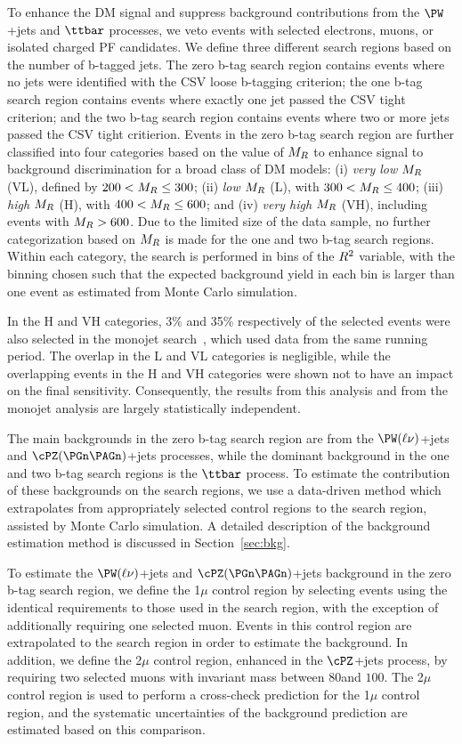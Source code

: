 To enhance the DM signal and suppress background contributions from the $\PW$+jets and $\ttbar$ processes,
we veto events with selected electrons, muons, or isolated charged PF candidates.
We define three different search regions based on the number of b-tagged jets. 
The zero b-tag search region contains events where no jets were identified with the CSV loose 
b-tagging criterion; the one b-tag search region contains events where exactly one jet
passed the CSV tight criterion; and the two b-tag search region contains events where two or more
jets passed the CSV tight critierion. Events in the zero b-tag search region are further classified 
into four categories based on the value of $M_R$ to enhance signal to background
discrimination for a broad class of DM models: 
(i) \textit{very low} $M_R$ (VL), defined by $200<M_R \leq 300$\GeV; 
(ii) \textit{low} $M_R$ (L), with $300 <M_R \leq 400$\GeV; 
(iii) \textit{high} $M_R$ (H), with $400 <M_R\leq 600$\GeV; 
and (iv) \textit{very high} $M_R$ (VH), including events with $M_R>600$\GeV. 
Due to the limited size of the data sample, no further 
categorization based on $M_R$ is made for the one and two b-tag search regions.
Within each category, the search is performed in bins of the $R^2$
variable, with the binning chosen such that the expected background yield
in each bin is larger than one event as estimated from Monte Carlo simulation.

In the H and VH categories, 3\% and 35\% respectively of the selected
events were also selected in the monojet search~\cite{monojet8TeV}, which used data from 
the same running period. The overlap in the L and VL categories is negligible, while the 
overlapping events in the H and VH categories were shown not to have an impact on the final 
sensitivity. Consequently, the results from this analysis and from the monojet analysis 
are largely statistically independent.

The main backgrounds in the zero b-tag search region are from the $\PW(\ell\nu)$+jets 
and $\cPZ(\PGn\PAGn)$+jets processes, while the dominant background in the one and two
b-tag search regions is the $\ttbar$ process. To estimate the contribution of these
backgrounds on the search regions, we use a data-driven method which extrapolates
from appropriately selected control regions to the search region, assisted by 
Monte Carlo simulation. A detailed description of the background
estimation method is discussed in Section~\ref{sec:bkg}.

To estimate the $\PW(\ell\nu)$+jets and $\cPZ(\PGn\PAGn)$+jets background in the
zero b-tag search region, we define the 1$\mu$ control region by selecting events
using the identical requirements to those used in the search region, with the exception 
of additionally requiring one selected muon. Events in this control region are extrapolated
to the search region in order to estimate the background. In addition, we define 
the 2$\mu$ control region, enhanced in the $\cPZ$+jets process, by requiring two selected 
muons with invariant mass between $80$\GeV and $100$\GeV. The 2$\mu$ control region is used to perform a cross-check prediction for the
1$\mu$ control region, and the systematic uncertainties of the
background prediction are estimated based on this comparison.


